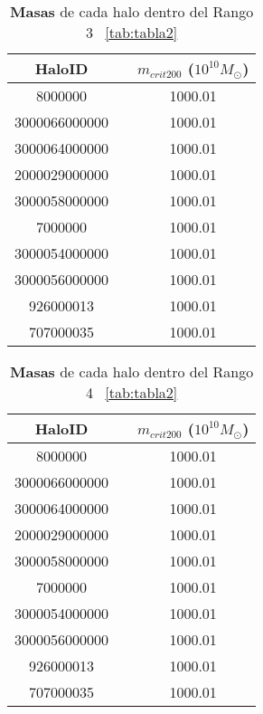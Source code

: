 \begin{table}[H]
\begin{center}
\begin{tabular}{ccc}
\toprule
\cellcolor[gray]{0.9}HaloID & & \cellcolor[gray]{0.9}$m_{crit200}$ ($10^{10}M_\odot$) \\
\midrule
8000000 & & 1000.01 \\
\midrule
3000066000000 & & 1000.01 \\
\midrule
3000064000000 & & 1000.01 \\
\midrule
2000029000000 & & 1000.01 \\
\midrule
3000058000000 & & 1000.01 \\
\midrule
7000000 & & 1000.01 \\
\midrule
3000054000000 & & 1000.01 \\
\midrule
3000056000000 & & 1000.01 \\
\midrule
926000013 & & 1000.01 \\
\midrule
707000035 & & 1000.01 \\
\bottomrule
\end{tabular}
\end{center}
\caption{\textbf{Masas} de cada halo dentro del Rango 3 ~\ref{tab:tabla2}}
\label{tab:tabla3}
\end{table}

\begin{table}[H]
\begin{center}
\begin{tabular}{ccc}
\toprule
\cellcolor[gray]{0.9}HaloID & & \cellcolor[gray]{0.9}$m_{crit200}$ ($10^{10}M_\odot$) \\
\midrule
8000000 & & 1000.01 \\
\midrule
3000066000000 & & 1000.01 \\
\midrule
3000064000000 & & 1000.01 \\
\midrule
2000029000000 & & 1000.01 \\
\midrule
3000058000000 & & 1000.01 \\
\midrule
7000000 & & 1000.01 \\
\midrule
3000054000000 & & 1000.01 \\
\midrule
3000056000000 & & 1000.01 \\
\midrule
926000013 & & 1000.01 \\
\midrule
707000035 & & 1000.01 \\
\bottomrule
\end{tabular}
\end{center}
\caption{\textbf{Masas} de cada halo dentro del Rango 4 ~\ref{tab:tabla2}}
\label{tab:tabla3}
\end{table}

